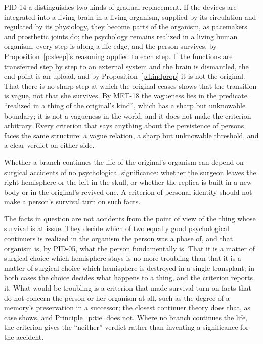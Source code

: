 \documentclass{situationist-preprint}
\begin{document}
\begin{reply}
PID-14-a distinguishes two kinds of gradual replacement. If the devices are integrated into a living brain in a living organism, supplied by its circulation and regulated by its physiology, they become parts of the organism, as pacemakers and prosthetic joints do; the psychology remains realized in a living human organism, every step is along a life edge, and the person survives, by Proposition~\ref{p:sleep}'s reasoning applied to each step. If the functions are transferred step by step to an external system and the brain is dismantled, the end point is an upload, and by Proposition~\ref{p:kindprop} it is not the original. That there is no sharp step at which the original ceases shows that the transition is vague, not that she survives. By MET-18 the vagueness lies in the predicate \enquote{realized in a thing of the original's kind}, which has a sharp but unknowable boundary; it is not a vagueness in the world, and it does not make the criterion arbitrary. Every criterion that says anything about the persistence of persons faces the same structure: a vague relation, a sharp but unknowable threshold, and a clear verdict on either side.
\end{reply}

\begin{objection}\label{o:accident}
Whether a branch continues the life of the original's organism can depend on surgical accidents of no psychological significance: whether the surgeon leaves the right hemisphere or the left in the skull, or whether the replica is built in a new body or in the original's revived one. A criterion of personal identity should not make a person's survival turn on such facts.
\end{objection}

\begin{reply}
The facts in question are not accidents from the point of view of the thing whose survival is at issue. They decide which of two equally good psychological continuers is realized in the organism the person was a phase of, and that organism is, by PID-05, what the person fundamentally is. That it is a matter of surgical choice which hemisphere stays is no more troubling than that it is a matter of surgical choice which hemisphere is destroyed in a single transplant; in both cases the choice decides what happens to a thing, and the criterion reports it. What would be troubling is a criterion that made survival turn on facts that do not concern the person or her organism at all, such as the degree of a memory's preservation in a successor; the closest continuer theory does that, as case \caseBranchLineWeak{} shows, and Principle~\ref{p:tie} does not. Where no branch continues the life, the criterion gives the \enquote{neither} verdict rather than inventing a significance for the accident.
\end{reply}
\end{document}
